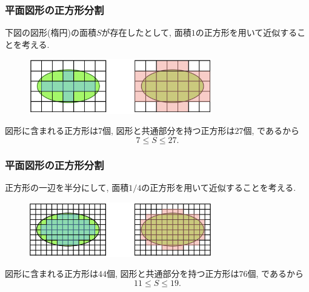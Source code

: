 

\begin{frame}
\frametitle{平面図形の正方形分割}
下図の図形(楕円)の面積$S$が存在したとして, 
面積$1$の正方形を用いて近似することを考える. 

\begin{figure}[htbp]
 \begin{center} 
  \includegraphics[width=80mm]{calculus12/cover.png}
 \end{center}
\end{figure}

図形に含まれる正方形は$7$個, 図形と共通部分を持つ正方形は$27$個, であるから
$$
7 \le S \le 27. 
$$

\end{frame}



\begin{frame}
\frametitle{平面図形の正方形分割}
正方形の一辺を半分にして, 面積$1/4$の正方形を用いて近似することを考える. 

\begin{figure}[htbp]
 \begin{center} 
  \includegraphics[width=80mm]{calculus12/cover2.png}
 \end{center}
\end{figure}

図形に含まれる正方形は$44$個, 図形と共通部分を持つ正方形は$76$個, であるから
$$
11 \le S \le 19. 
$$

\end{frame}




